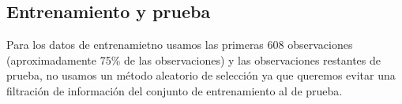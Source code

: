 \documentclass[12pt,reqno,letter]{article}
\begin{document}
\begin{multicols}{2}
        
        




\subsection{Entrenamiento y prueba}

Para los datos de entrenamietno usamos las primeras 608 observaciones (aproximadamente 75\% de las observaciones) y las observaciones restantes de prueba, no usamos un método aleatorio de selección ya que queremos evitar una filtración de información del conjunto de entrenamiento al de prueba.



\end{multicols}
\end{document}
